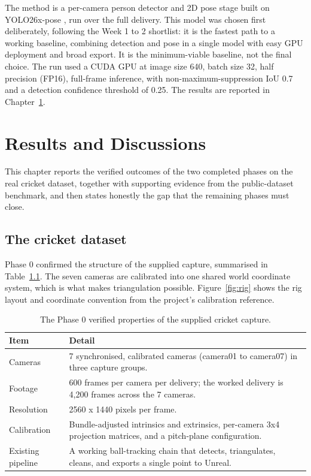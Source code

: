 \documentclass[oneside,openany]{book}
\begin{document}
The method is a per-camera person detector and 2D pose stage built on YOLO26x-pose
\cite{ultralytics_pose}, run over the full delivery. This model was chosen first deliberately,
following the Week 1 to 2 shortlist: it is the fastest path to a working baseline, combining
detection and pose in a single model with easy GPU deployment and broad export. It is the
minimum-viable baseline, not the final choice. The run used a CUDA GPU at image size 640, batch
size 32, half precision (FP16), full-frame inference, with non-maximum-suppression IoU 0.7 and a
detection confidence threshold of 0.25. The results are reported in Chapter~\ref{ch:results}.

\chapter{Results and Discussions}
\label{ch:results}
This chapter reports the verified outcomes of the two completed phases on the real cricket
dataset, together with supporting evidence from the public-dataset benchmark, and then states
honestly the gap that the remaining phases must close.

\section{The cricket dataset}
Phase 0 confirmed the structure of the supplied capture, summarised in
Table~\ref{tab:dataset}. The seven cameras are calibrated into one shared world coordinate
system, which is what makes triangulation possible. Figure~\ref{fig:rig} shows the rig layout
and coordinate convention from the project's calibration reference.

\begin{table}[!h]
	\begin{center}
		\caption{The Phase 0 verified properties of the supplied cricket capture.}
		\label{tab:dataset}
		\footnotesize
		\begin{tabular}{p{3.2cm}p{10.8cm}}
			\toprule
			\textbf{Item} & \textbf{Detail} \\
			\midrule
			Cameras & 7 synchronised, calibrated cameras (camera01 to camera07) in three capture
			groups. \\
			Footage & 600 frames per camera per delivery; the worked delivery is 4{,}200 frames
			across the 7 cameras. \\
			Resolution & 2560 x 1440 pixels per frame. \\
			Calibration & Bundle-adjusted intrinsics and extrinsics, per-camera 3x4 projection
			matrices, and a pitch-plane configuration. \\
			Existing pipeline & A working ball-tracking chain that detects, triangulates, cleans,
			and exports a single point to Unreal. \\
			\bottomrule
		\end{tabular}
	\end{center}
\end{table}
\end{document}
